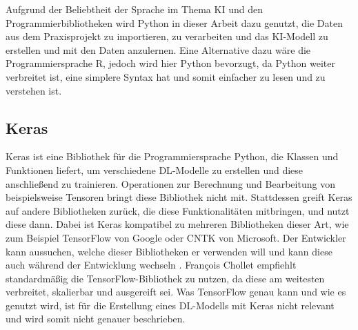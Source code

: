 Aufgrund der Beliebtheit der Sprache im Thema \ac{KI} und den Programmierbibliotheken wird Python in dieser Arbeit dazu genutzt,
die Daten aus dem Praxisprojekt zu importieren, zu verarbeiten und das \ac{KI}-Modell zu erstellen und mit den Daten anzulernen.
Eine Alternative dazu wäre die Programmiersprache R, jedoch wird hier Python bevorzugt, da Python weiter verbreitet ist, eine simplere Syntax hat und somit 
einfacher zu lesen und zu verstehen ist.

\subsection{Keras}
\label{chap:Keras}
Keras ist eine Bibliothek für die Programmiersprache Python, die Klassen und Funktionen liefert, um verschiedene \ac{DL}-Modelle zu erstellen
und diese anschließend zu trainieren. Operationen zur Berechnung und Bearbeitung von beispielsweise Tensoren bringt diese Bibliothek nicht mit.
Stattdessen greift Keras auf andere Bibliotheken zurück, die diese Funktionalitäten mitbringen, und nutzt diese dann. Dabei ist Keras kompatibel zu mehreren
Bibliotheken dieser Art, wie zum Beispiel TensorFlow von Google oder CNTK von Microsoft. Der Entwickler kann aussuchen, welche dieser Bibliotheken er
verwenden will und kann diese auch während der Entwicklung wechseln \cite[vgl. S.89ff.]{DL_PY}. François Chollet empfiehlt standardmäßig die TensorFlow-Bibliothek zu nutzen, da diese 
\glqq am weitesten verbreitet, skalierbar und ausgereift\grqq{} \cite[S.91]{DL_PY} sei. Was TensorFlow genau kann und wie es genutzt wird, ist für die Erstellung eines
\ac{DL}-Modells mit Keras nicht relevant und wird somit nicht genauer beschrieben.

